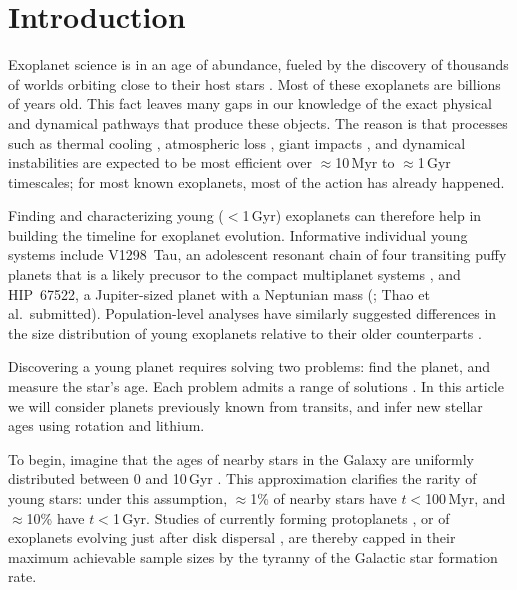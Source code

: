 \documentclass[11pt,twocolumn,tighten]{aastex63}
\begin{document}
\section{Introduction}
\label{sec:intro}

Exoplanet science is in an age of abundance, fueled by the discovery
of thousands of worlds orbiting close to their host stars
\citep{Borucki10,2015JATIS...1a4003R}.  Most of these exoplanets are
billions of years old.  This fact leaves many gaps in our knowledge of
the exact physical and dynamical pathways that produce these objects.
The reason is that processes such as thermal cooling
\citep{2007ApJ...659.1661F}, atmospheric loss
\citep{2019AREPS..47...67O}, giant impacts
\citep{2014prpl.conf..595R}, and dynamical instabilities
\citep{2017MNRAS.470.1750I} are expected to be most efficient over
$\approx$10\,Myr to $\approx$1\,Gyr timescales; for most known
exoplanets, most of the action has already happened.

Finding and characterizing young ($<$1\,Gyr) exoplanets can therefore
help in building the timeline for exoplanet evolution.  Informative
individual young systems include V1298~Tau, an adolescent resonant
chain of four transiting puffy planets that is a likely precusor to
the compact multiplanet systems \citep{David_2019}, and HIP~67522, a
Jupiter-sized planet with a Neptunian mass (\citealt{Rizzuto_2020};
Thao et al.~submitted).  Population-level analyses have similarly
suggested differences in the size distribution of young exoplanets
relative to their older counterparts
\citep{Berger_2020b_rpage,David_2021,Sandoval_2021,2023AJ....166..248C,2024arXiv240303261V}.

Discovering a young planet requires solving two problems: find the
planet, and measure the star's age.  Each problem admits a range of
solutions \citep[e.g.][]{2008Sci...322.1348M,2012ApJ...756L..33Q}.  In
this article we will consider planets previously known from transits,
and infer new stellar ages using rotation and lithium.

To begin, imagine that the ages of nearby stars in the Galaxy are
uniformly distributed between 0 and 10\,Gyr \citep[e.g.~Fig~17
of][]{Nordstrom_2004}.  This approximation clarifies the rarity of
young stars: under this assumption, $\approx$1\% of nearby stars have
$t$$<$100\,Myr, and $\approx$10\% have $t$$<$1\,Gyr.  Studies of
currently forming protoplanets \citep{2018A&A...617A..44K}, or of
exoplanets evolving just after disk dispersal
\citep[e.g.][]{2022MNRAS.512.5067K}, are thereby capped in their
maximum achievable sample sizes by the tyranny of the Galactic star
formation rate.
\end{document}
